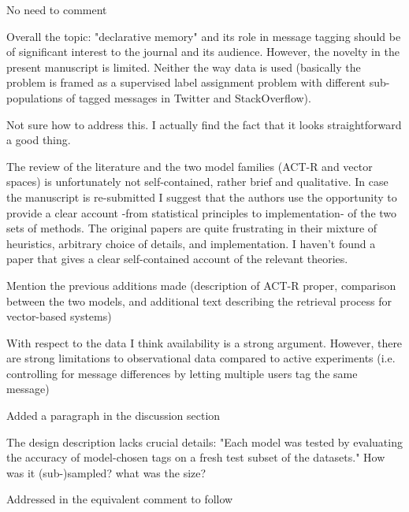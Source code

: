 \documentclass[answers,12pt]{exam}
\begin{document}
\begin{questions}
\begin{solution}
No need to comment
\end{solution}

\question Overall the topic: "declarative memory" and its role in message tagging should be of significant interest to the journal and its audience. However, the novelty in the present manuscript is limited. Neither the way data is used (basically the problem is framed as a supervised label assignment problem with different sub-populations of tagged messages in Twitter and StackOverflow). 

\begin{solution}
Not sure how to address this. I actually find the fact that it looks straightforward a good thing.
\end{solution}

\question The review of the literature and the two model families (ACT-R and vector spaces) is unfortunately not self-contained, rather brief and qualitative. In case the manuscript is re-submitted I suggest that the authors use the opportunity to provide a clear account -from statistical principles to implementation- of the two sets of methods. The original papers are quite frustrating in their mixture of heuristics, arbitrary choice of details, and implementation. I haven't found a paper that gives a clear self-contained account of the relevant theories.

\begin{solution}
Mention the previous additions made (description of ACT-R proper, comparison between the two models, and  additional text describing the retrieval process for vector-based systems)
\end{solution}

\question With respect to the data I think availability is a strong argument. However, there are strong limitations to observational data compared to active experiments (i.e. controlling for message differences by letting multiple users tag the same message)

\begin{solution}
Added a paragraph in the discussion section
\end{solution}

\question The design description lacks crucial details: "Each model was tested by evaluating the accuracy of model-chosen tags on a fresh test subset of the datasets." How was it (sub-)sampled? what was the size?

\begin{solution}
Addressed in the equivalent comment to follow
\end{solution}


\end{questions}
\end{document}
